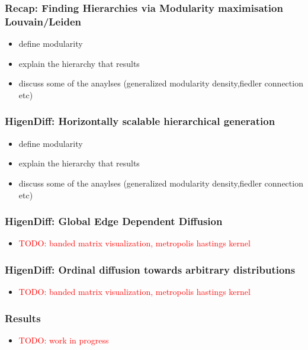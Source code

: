 \documentclass[./presentation.tex]{subfiles}
\begin{document}
\begin{frame}[label=working]
  \frametitle{Recap: Finding Hierarchies via Modularity maximisation Louvain/Leiden}
  \begin{itemize}
    \item define modularity
    \item explain the hierarchy that results
    \item discuss some of the anaylses (generalized modularity density,fiedler connection etc)
  \end{itemize}
\end{frame}
\begin{frame}[label=working]
  \frametitle{HigenDiff: Horizontally scalable hierarchical generation}
  \begin{itemize}
    \item define modularity
    \item explain the hierarchy that results
    \item discuss some of the anaylses (generalized modularity density,fiedler connection etc)
  \end{itemize}
\end{frame}
\begin{frame}[label=working]
  \frametitle{HigenDiff: Global Edge Dependent Diffusion}
  \begin{itemize}
    \item \textcolor{red}{TODO: banded matrix visualization, metropolis hastings kernel}
  \end{itemize}
\end{frame}


\begin{frame}[label=working]
  \frametitle{HigenDiff: Ordinal diffusion towards arbitrary distributions}
  \begin{itemize}
    \item \textcolor{red}{TODO: banded matrix visualization, metropolis hastings kernel}
  \end{itemize}
\end{frame}

\begin{frame}[label=working]
  \frametitle{Results}
  \begin{itemize}
    \item \textcolor{red}{TODO: work in progress}
  \end{itemize}
\end{frame}
\end{document}
